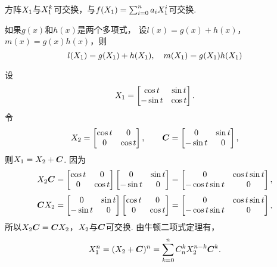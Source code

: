 \begin{theorem}
方阵\(X_1\)与\(X_1^k\)可交换，与\(f(X_1) = \sum_{i=0}^n a_i X_1^i\)可交换.
\end{theorem}

\begin{theorem}
如果\(g(x)\)和\(h(x)\)是两个多项式，
设\(l(x) = g(x) + h(x)\)，\(m(x) = g(x) h(x)\)，则\[
	l(X_1) = g(X_1) + h(X_1),
	\quad
	m(X_1) = g(X_1) h(X_1)
\]
\end{theorem}

\begin{example}
设\[
	X_1 = \begin{bmatrix}
	\cos t & \sin t \\
	-\sin t & \cos t
	\end{bmatrix}.
\]
令\[
	X_2 = \begin{bmatrix}
		\cos t & 0 \\
		0 & \cos t
	\end{bmatrix},
	\qquad
	\boldsymbol{C} = \begin{bmatrix}
		0 & \sin t \\
		-\sin t & 0
	\end{bmatrix},
\]
则\(X_1=X_2+\boldsymbol{C}\).
因为\[
	X_2\boldsymbol{C} = \begin{bmatrix}
		\cos t & 0 \\
		0 & \cos t
	\end{bmatrix}
	\begin{bmatrix}
		0 & \sin t \\
		-\sin t & 0
	\end{bmatrix}
	= \begin{bmatrix}
		0 & \cos t \sin t \\
		-\cos t \sin t & 0
	\end{bmatrix},
\]\[
	\boldsymbol{C}X_2 = \begin{bmatrix}
		0 & \sin t \\
		-\sin t & 0
	\end{bmatrix}
	\begin{bmatrix}
		\cos t & 0 \\
		0 & \cos t
	\end{bmatrix}
	= \begin{bmatrix}
		0 & \cos t \sin t \\
		-\cos t \sin t & 0
	\end{bmatrix},
\]
所以\(X_2\boldsymbol{C}=\boldsymbol{C}X_2\)，\(X_2\)与\(\boldsymbol{C}\)可交换.
由牛顿二项式定理有，\[
	X_1^n=(X_2+\boldsymbol{C})^n
	=\sum_{k=0}^n C_n^k X_2^{n-k} \boldsymbol{C}^k.
\]
\end{example}

